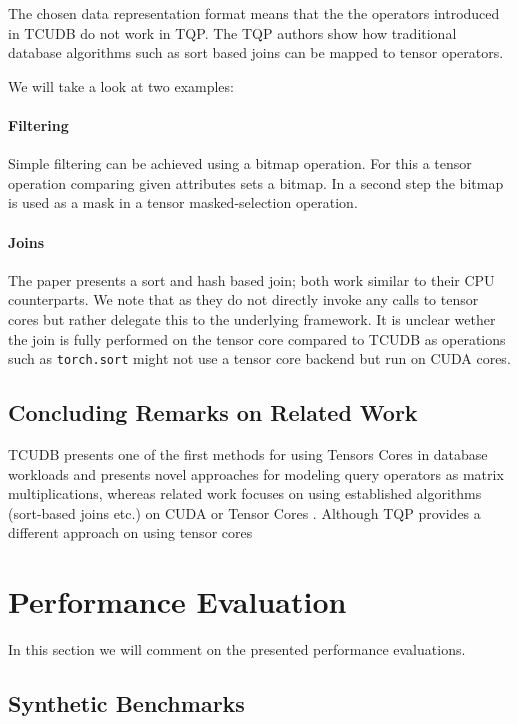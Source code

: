 \documentclass{paper}
\begin{document}
	The chosen data representation format means that the the operators introduced in TCUDB do not work in TQP. The TQP authors show how traditional database algorithms such as sort based joins can be mapped to tensor operators. 
	
	We will take a look at two examples:
	
	\paragraph{Filtering}
	Simple filtering can be achieved using a bitmap operation. For this a tensor operation comparing given attributes sets a bitmap. In a second step the bitmap is used as a mask in a tensor masked-selection operation. 

	\paragraph{Joins}
	
	The paper presents a sort and hash based join; both work similar to their CPU counterparts. We note that as they do not directly invoke any calls to tensor cores but rather delegate this to the underlying framework. It is unclear wether the join is fully performed on the tensor core compared to TCUDB as operations such as \texttt{torch.sort} might not use a tensor core backend but run on CUDA cores.
	
	\subsection{Concluding Remarks on Related Work}
	
	TCUDB presents one of the first methods for using Tensors Cores in database workloads and presents novel approaches for modeling query operators as matrix multiplications, whereas related work focuses on using established algorithms (sort-based joins etc.) on CUDA \cite{yuan2013yin} or Tensor Cores \cite{he2022query}. Although TQP provides a different approach on using tensor cores 
	
	\section{Performance Evaluation} \label{sec:perf_eval}
	In this section we will comment on the presented performance evaluations.

	\subsection{Synthetic Benchmarks}
	
\end{document}
